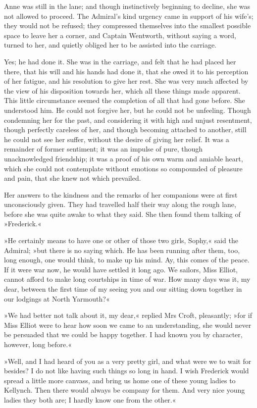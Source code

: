 Anne was still in the lane; and though instinctively beginning to decline, she was not allowed to proceed. The Admiral's kind urgency came in support of his wife's; they would not be refused; they compressed themselves into the smallest possible space to leave her a corner, and Captain Wentworth, without saying a word, turned to her, and quietly obliged her to be assisted into the carriage.

Yes; he had done it. She was in the carriage, and felt that he had placed her there, that his will and his hands had done it, that she owed it to his perception of her fatigue, and his resolution to give her rest. She was very much affected by the view of his disposition towards her, which all these things made apparent. This little circumstance seemed the completion of all that had gone before. She understood him. He could not forgive her, but he could not be unfeeling. Though condemning her for the past, and considering it with high and unjust resentment, though perfectly careless of her, and though becoming attached to another, still he could not see her suffer, without the desire of giving her relief. It was a remainder of former sentiment; it was an impulse of pure, though unacknowledged friendship; it was a proof of his own warm and amiable heart, which she could not contemplate without emotions so compounded of pleasure and pain, that she knew not which prevailed.

Her answers to the kindness and the remarks of her companions were at first unconsciously given. They had travelled half their way along the rough lane, before she was quite awake to what they said. She then found them talking of »Frederick.«

»He certainly means to have one or other of those two girls, Sophy,« said the Admiral; »but there is no saying which. He has been running after them, too, long enough, one would think, to make up his mind. Ay, this comes of the peace. If it were war now, he would have settled it long ago. We sailors, Miss Elliot, cannot afford to make long courtships in time of war. How many days was it, my dear, between the first time of my seeing you and our sitting down together in our lodgings at North Yarmouth?«

»We had better not talk about it, my dear,« replied Mrs Croft, pleasantly; »for if Miss Elliot were to hear how soon we came to an understanding, she would never be persuaded that we could be happy together. I had known you by character, however, long before.«

»Well, and I had heard of you as a very pretty girl, and what were we to wait for besides? I do not like having such things so long in hand. I wish Frederick would spread a little more canvass, and bring us home one of these young ladies to Kellynch. Then there would always be company for them. And very nice young ladies they both are; I hardly know one from the other.«

